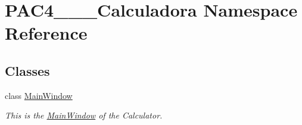 \hypertarget{namespace_p_a_c4_______calculadora}{}\section{P\+A\+C4\+\_\+\+\_\+\+\_\+\+Calculadora Namespace Reference}
\label{namespace_p_a_c4_______calculadora}
\subsection*{Classes}
\begin{DoxyCompactItemize}
\item 
class \mbox{\hyperlink{class_p_a_c4_______calculadora_1_1_main_window}{Main\+Window}}
\begin{DoxyCompactList}\small\item\em This is the \mbox{\hyperlink{class_p_a_c4_______calculadora_1_1_main_window}{Main\+Window}} of the Calculator. \end{DoxyCompactList}\end{DoxyCompactItemize}
